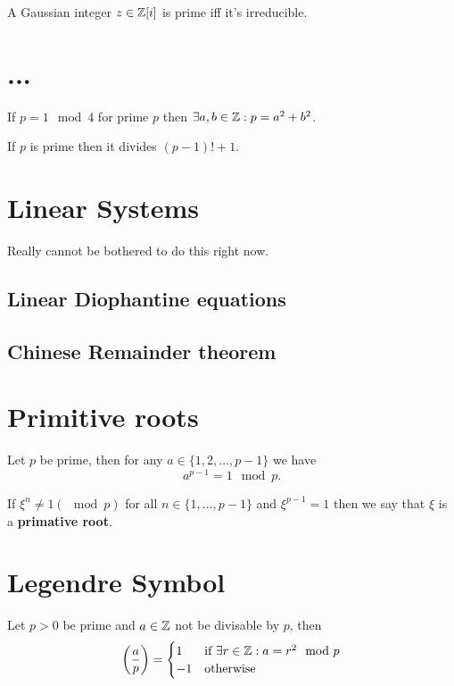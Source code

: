 \documentclass{article}
\begin{document}
\begin{theorem}
A Gaussian integer $z\in\mathbb{Z}[i]$ is prime iff it's irreducible.
\end{theorem}


\section*{...}
\begin{theorem}
If $p= 1\mod 4$ for prime $p$ then $\exists a,b\in\mathbb{Z}: p=a^2+b^2$.
\end{theorem}

\begin{theorem}[Wilson]
If $p$ is prime then it divides $(p-1)!+1$.
\end{theorem}

\section*{Linear Systems}
Really cannot be bothered to do this right now.
\subsection*{Linear Diophantine equations}
\subsection*{Chinese Remainder theorem}

\section*{Primitive roots}
\begin{theorem}
Let $p$ be prime, then for any $a\in\{1,2,\dots,p-1\}$ we have
    \[
    a^{p-1} = 1\mod p.
    \]
\end{theorem}

\begin{definition}
If $\xi^n\neq1 (\mod p)$ for all $n\in\{1,\dots,p-1\}$ and $\xi^{p-1}=1$ then we say that $\xi$ is a \textbf{primative root}.
\end{definition}

\section*{Legendre Symbol}
\begin{definition}
Let $p>0$ be prime and $a\in\mathbb{Z}$ not be divisable by $p$, then
    \[
    \left(\frac{a}{p}\right)=
    \begin{cases}
    1 &\text{if } \exists r\in\mathbb{Z}: a=r^2\mod p \\
    -1&\text{otherwise}
    \end{cases}
    \]
\end{definition}
\end{document}
